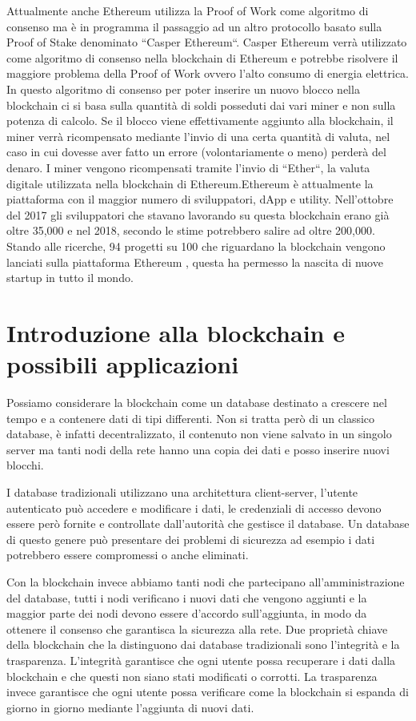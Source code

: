 \documentclass[12pt]{report}
\begin{document}
Attualmente anche Ethereum utilizza la Proof of Work come algoritmo di consenso ma è in programma il passaggio ad un altro protocollo basato sulla Proof of Stake denominato ``Casper Ethereum``.
\newline
Casper Ethereum verrà utilizzato come algoritmo di consenso nella blockchain di Ethereum e potrebbe risolvere il maggiore problema della Proof of Work ovvero l'alto consumo di energia elettrica.
In questo algoritmo di consenso per poter inserire un nuovo blocco nella blockchain ci si basa sulla quantità di soldi posseduti dai vari miner e non sulla potenza di calcolo.
Se il blocco viene effettivamente aggiunto alla blockchain, il miner verrà ricompensato mediante l'invio di una certa quantità di valuta, nel caso in cui dovesse aver fatto un errore (volontariamente o meno) perderà del denaro.
I miner vengono ricompensati tramite l'invio di ``Ether``, la valuta digitale utilizzata nella blockchain di Ethereum.\newline Ethereum è attualmente la piattaforma con il maggior numero di sviluppatori, dApp e utility. 
Nell'ottobre del 2017 gli sviluppatori che stavano lavorando su questa blockchain erano già oltre 35,000 \cite{sviluppatoriEthereum} e nel 2018, secondo le stime potrebbero salire ad oltre 200,000.
Stando alle ricerche, 94 progetti su 100 che riguardano la blockchain vengono lanciati sulla piattaforma Ethereum \cite{progettiEthereum}, questa ha permesso la nascita di nuove startup in tutto il mondo.


\section{Introduzione alla blockchain e possibili applicazioni}

Possiamo considerare la blockchain come un database destinato a crescere nel tempo e a contenere dati di tipi differenti.
Non si tratta però di un classico database, è infatti decentralizzato, il contenuto non viene salvato in un singolo server ma tanti nodi della rete hanno una copia dei dati e posso inserire nuovi blocchi.

I database tradizionali utilizzano una architettura client-server, l'utente autenticato può accedere e modificare i dati, le credenziali di accesso devono essere però fornite e controllate dall'autorità che gestisce il database. 
Un database di questo genere può presentare dei problemi di sicurezza ad esempio i dati potrebbero essere compromessi o anche eliminati.

Con la blockchain invece abbiamo tanti nodi che partecipano all'amministrazione del database, tutti i nodi verificano i nuovi dati che vengono aggiunti e la maggior parte dei nodi devono essere d'accordo sull'aggiunta, in modo da ottenere il consenso che garantisca la sicurezza alla rete.
Due proprietà chiave della blockchain che la distinguono dai database tradizionali sono l'integrità e la trasparenza.
L'integrità garantisce che ogni utente possa recuperare i dati dalla blockchain e che questi non siano stati modificati o corrotti.
La trasparenza invece garantisce che ogni utente possa verificare come la blockchain si espanda di giorno in giorno mediante l'aggiunta di nuovi dati.
\end{document}
